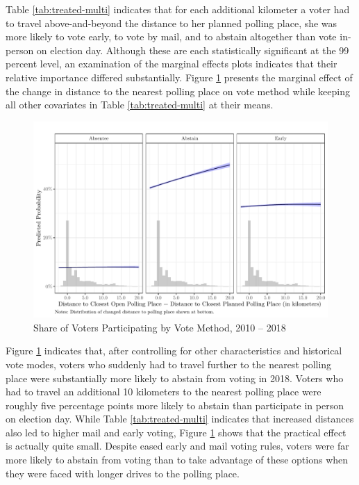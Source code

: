 \documentclass[
  12pt,
]{article}
\begin{document}
\begin{singlespace}

\end{singlespace}

Table \ref{tab:treated-multi} indicates that for each additional kilometer a voter had to travel above-and-beyond the distance to her planned polling place, she was more likely to vote early, to vote by mail, and to abstain altogether than vote in-person on election day. Although these are each statistically significant at the 99 percent level, an examination of the marginal effects plots indicates that their relative importance differed substantially. Figure \ref{fig:marg-multi} presents the marginal effect of the change in distance to the nearest polling place on vote method while keeping all other covariates in Table \ref{tab:treated-multi} at their means.

\begin{figure}[H]

{\centering \includegraphics{hurricane_michael_files/figure-latex/marg-multi-1} 

}

\caption{\label{fig:marg-multi}Share of Voters Participating by Vote Method, 2010 -- 2018}\label{fig:marg-multi}
\end{figure}

Figure \ref{fig:marg-multi} indicates that, after controlling for other characteristics and historical vote modes, voters who suddenly had to travel further to the nearest polling place were substantially more likely to abstain from voting in 2018. Voters who had to travel an additional 10 kilometers to the nearest polling place were roughly five percentage points more likely to abstain than participate in person on election day. While Table \ref{tab:treated-multi} indicates that increased distances also led to higher mail and early voting, Figure \ref{fig:marg-multi} shows that the practical effect is actually quite small. Despite eased early and mail voting rules, voters were far more likely to abstain from voting than to take advantage of these options when they were faced with longer drives to the polling place.
\end{document}
